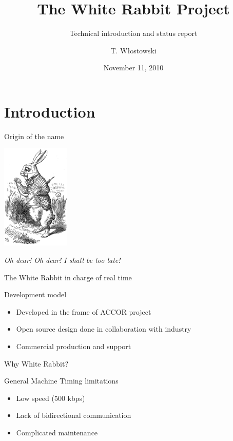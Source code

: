\documentclass[xcolor=dvipsnames]{beamer}
\title[WR Project Status\hspace{2em}\insertframenumber/
\inserttotalframenumber]{The White Rabbit Project}
\subtitle{Technical introduction and status report}
\author{T. Włostowski}
\date{November 11, 2010}
\institute%
{
  BE-CO Hardware and Timing section\\
  CERN
 }
\begin{document}
\frame{\titlepage}


\section{Introduction}
\begin{frame}{Origin of the name}
\begin{center}
\includegraphics[height=5cm]{misc/Alice-wr.jpg}

\textit{Oh dear! Oh dear! I shall be too late!}\\
\begin{small}
The White Rabbit in charge of real time
\end{small}
\end{center}
\end{frame}


\begin{frame}{Development model}
\begin{itemize}
\item Developed in the frame of ACCOR project
\item Open source design done in collaboration with industry
\item Commercial production and support
\end{itemize}
\end{frame}

\begin{frame}{Why White Rabbit?}
\begin{block}{General Machine Timing limitations}
\begin{itemize}
\item Low speed (500 kbps)
\item Lack of bidirectional communication
\item Complicated maintenance
\end{itemize}
\end{block}
\end{frame}
\end{document}
